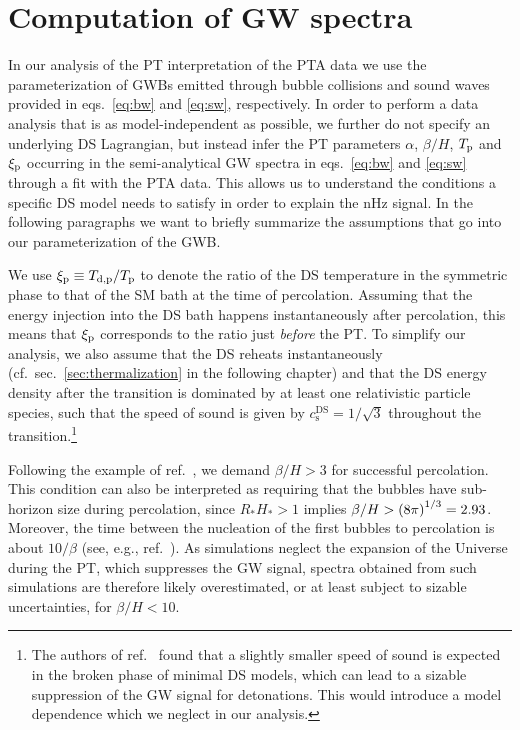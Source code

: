 \section{Computation of GW spectra}
\label{sec:spectra}

In our analysis of the \ac{PT} interpretation of the \ac{PTA} data we use the parameterization of \acp{GWB} emitted through bubble collisions and sound waves provided in eqs.~\eqref{eq:bw} and \eqref{eq:sw}, respectively. In order to perform a data analysis that  is as model-independent as possible, we further do not specify an underlying \ac{DS} Lagrangian, but instead infer the \ac{PT} parameters $\alpha$, $\beta/H$, $T_{\text{p}}$ and $\xi_{\text{p}}$  occurring in the semi-analytical \ac{GW} spectra in eqs.~\eqref{eq:bw} and \eqref{eq:sw} through a fit with the \ac{PTA} data. This allows us to understand the conditions a specific \ac{DS} model needs to satisfy in order to explain the nHz signal. In the following paragraphs we want to briefly summarize the assumptions that go into our parameterization of the \ac{GWB}.

We use $\xi_{\text{p}} \equiv T_\text{d,p} / T_\text{p}$ to denote the ratio of the \ac{DS} temperature in the symmetric phase to that of the \ac{SM} bath at the time of percolation. Assuming that the energy injection into the \ac{DS} bath happens instantaneously after percolation, this means that $\xi_{\text{p}}$ corresponds to the ratio just \textit{before} the \ac{PT}. To simplify our analysis,  we also assume that the \ac{DS} reheats instantaneously (cf.~sec.~\ref{sec:thermalization} in the following chapter) and that the \ac{DS} energy density after the transition is dominated by at least one relativistic particle species, such that the speed of sound is given by $c_\text{s}^\text{DS} = {1}/{\sqrt{3}}$ throughout the transition.\footnote{The authors of ref.~\cite{Tenkanen:2022tly} found that a slightly smaller speed of sound is expected in the broken phase of minimal \ac{DS} models, which can lead to a sizable suppression of the \ac{GW} signal for detonations. This would introduce a model dependence which we neglect in our analysis.}

Following the example of ref.~\cite{Freese:2022qrl}, we demand $\beta/H>3$ for successful percolation. This condition can also be interpreted as requiring that the bubbles have sub-horizon size during percolation, since $R_\ast H_\ast > 1$ implies $\beta/H > \left( 8 \pi \right)^{1/3} = 2.93$. Moreover, the time between the nucleation of the first bubbles to  percolation is about $10/\beta$ (see, e.g., ref.~\cite{Jinno:2022mie}). As simulations neglect the expansion of the Universe during the \ac{PT}, which suppresses the \ac{GW} signal, spectra obtained from such simulations are therefore likely overestimated, or at least subject to sizable uncertainties, for $\beta/H<10$. 

